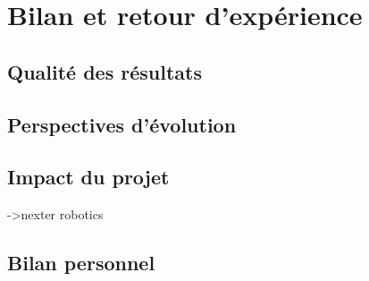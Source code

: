 \chapter{Bilan et retour d'expérience}

	\section{Qualité des résultats}
	

	\section{Perspectives d'évolution}
	

	\section{Impact du projet}
		
		->nexter robotics
	
	\section{Bilan personnel}
	
